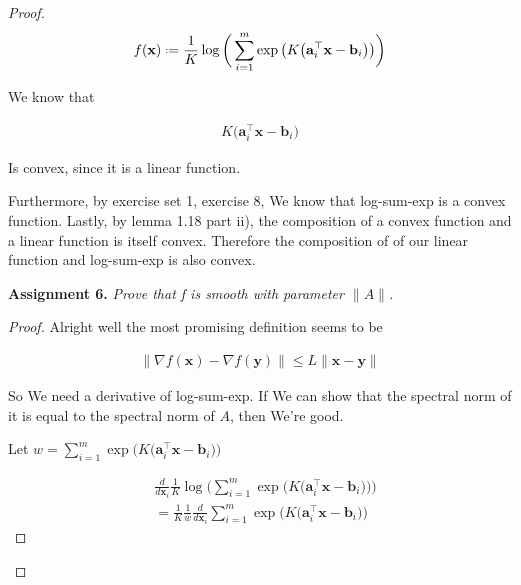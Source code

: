 \documentclass{article}
\newcommand*{\defeq}{\mathrel{\vcenter{\baselineskip0.5ex \lineskiplimit0pt
                     \hbox{\scriptsize.}\hbox{\scriptsize.}}}%
                     =}
\begin{document}
\begin{proof}
	\begin{align}
		f(\mathbf{x}) \defeq \frac{1}{K}\log\bigg( \sum^m_{i=1}\exp\big(K\big( \mathbf{a}_i^\top\mathbf{x} - \mathbf{b}_i\big) \big) \bigg)
	\end{align}
	
	We know that
	
	\begin{align}
		K\big( \mathbf{a}_i^\top\mathbf{x} - \mathbf{b}_i\big) 
	\end{align}
	
	Is convex, since it is a linear function.
	
	Furthermore, by exercise set 1, exercise 8, We know that log-sum-exp is a convex function. Lastly, by lemma 1.18 part ii), the composition of a convex function and a linear function is itself convex. Therefore the composition of of our linear function and log-sum-exp is also convex.
	
\textbf{Assignment 6.} \textit{Prove that f is smooth with parameter $\|A\|$.}

\begin{proof}
	Alright well the most promising definition seems to be
	
	\begin{align}
		\|\nabla f(\mathbf{x}) - \nabla f(\mathbf{y})\| \le L\|\mathbf{x}-\mathbf{y}\|
	\end{align}
	
	So We need a derivative of log-sum-exp. If We can show that the spectral norm of it is equal to the spectral norm of $A$, then We're good. 
	
	Let $w = \sum^m_{i=1}\exp\big(K\big( \mathbf{a}_i^\top\mathbf{x} - \mathbf{b}_i\big) \big)$
	
	\begin{align}
		&\frac{d}{d\mathbf{x}_i}  \frac{1}{K}\log\bigg( \sum^m_{i=1}\exp\big(K\big( \mathbf{a}_i^\top\mathbf{x} - \mathbf{b}_i\big) \big) \bigg)\\
		&= \frac{1}{K} \frac{1}{w}\frac{d}{d\mathbf{x}_i} \sum^m_{i=1}\exp\big(K\big( \mathbf{a}_i^\top\mathbf{x} - \mathbf{b}_i\big) \big)
	\end{align}
\end{proof}
	
	
	
	
	
	
	
	
	
	
	
\end{proof}















	
\end{document}
